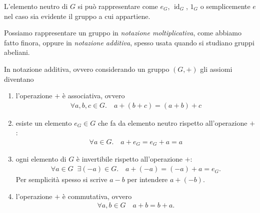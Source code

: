 L'elemento neutro di $G$ si può rappresentare come $e_G$, $\operatorname{id}_G$, $1_G$ o semplicemente $e$ nel caso sia evidente il gruppo a cui appartiene.

Possiamo rappresentare un gruppo in \emph{notazione moltiplicativa}, come abbiamo fatto finora, oppure in \emph{notazione additiva}, spesso usata quando si studiano gruppi abeliani. 

In notazione additiva, ovvero considerando un gruppo $(G, +)$ gli assiomi diventano \begin{enumerate}[label={(G\arabic*)}]
    \item l'operazione $+$ è associativa, ovvero \begin{align*}
        \forall a, b, c \in G. \quad a + (b + c) = (a + b) + c
    \end{align*}
    \item esiste un elemento $e_G \in G$ che fa da elemento neutro rispetto all'operazione $+$: \begin{align*}
        \forall a \in G. \quad a + e_G = e_G + a = a 
    \end{align*}
    \item ogni elemento di $G$ è invertibile rispetto all'operazione $+$: \begin{align*}
        \forall a \in G \;\;
        \exists (-a) \in G.
        \quad a + (-a) = (-a) + a = e_G.
    \end{align*}
    Per semplicità spesso si scrive $a - b$ per intendere $a + (-b)$.
    \item l'operazione $+$ è commutativa, ovvero \begin{align*}
        \forall a, b \in G \quad a + b = b + a.
    \end{align*}
\end{enumerate}

